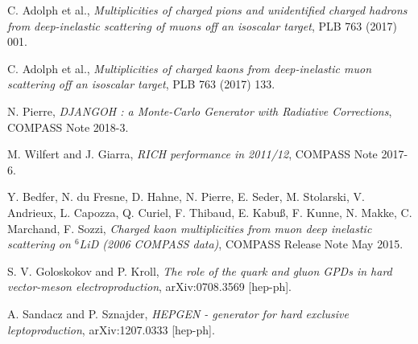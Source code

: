 \documentclass[letterpaper,12pt]{article}
\begin{document}
\begin{thebibliography}{99}

C. Adolph et al., \textit{Multiplicities of charged pions and unidentified charged hadrons from deep-inelastic scattering of muons off an isoscalar target}, PLB 763 (2017) 001.

C. Adolph et al., \textit{Multiplicities of charged kaons from deep-inelastic muon scattering off an isoscalar target}, PLB 763 (2017) 133.

N. Pierre, \textit{DJANGOH : a Monte-Carlo Generator with Radiative Corrections}, COMPASS Note 2018-3.

M. Wilfert and J. Giarra, \textit{RICH performance in 2011/12}, COMPASS Note 2017-6.

Y. Bedfer, N. du Fresne, D. Hahne, N. Pierre, E. Seder, M. Stolarski, V. Andrieux, L. Capozza, Q. Curiel, F. Thibaud, E. Kabu{\ss}, F. Kunne, N. Makke, C. Marchand, F. Sozzi, \textit{Charged kaon multiplicities from muon deep inelastic scattering on $^6$LiD (2006 COMPASS data)}, COMPASS Release Note May 2015.

S. V. Goloskokov and P. Kroll, \textit{The role of the quark and gluon GPDs in hard vector-meson electroproduction}, arXiv:0708.3569 [hep-ph].

A. Sandacz and P. Sznajder, \textit{HEPGEN - generator for hard exclusive leptoproduction}, arXiv:1207.0333 [hep-ph].

\end{thebibliography}
\end{document}
